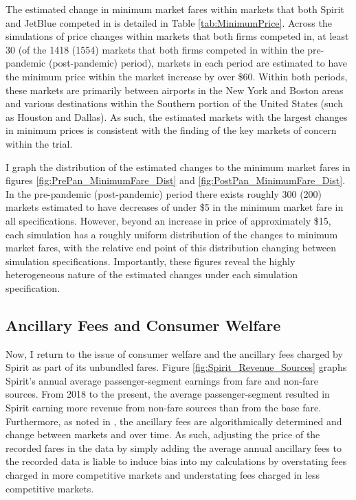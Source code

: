 \documentclass{article}
\begin{document}
     The estimated change in minimum market fares within markets that both Spirit and JetBlue competed in is detailed in Table \ref{tab:MinimumPrice}. Across the simulations of price changes within markets that both firms competed in, at least 30 (of the 1418 (1554) markets that both firms competed in within the pre-pandemic (post-pandemic) period), markets in each period are estimated to have the minimum price within the market increase by over \$60. Within both periods, these markets are primarily between airports in the New York and Boston areas and various destinations within the Southern portion of the United States (such as Houston and Dallas). As such, the estimated markets with the largest changes in minimum prices is consistent with the finding of the key markets of concern within the trial. 

    I graph the distribution of the estimated changes to the minimum market fares in figures \ref{fig:PrePan_MinimumFare_Dist} and \ref{fig:PostPan_MinimumFare_Dist}. In the pre-pandemic (post-pandemic) period there exists roughly 300 (200) markets estimated to have decreases of under \$5 in the minimum market fare in all specifications. However, beyond an increase in price of approximately \$15, each simulation has a roughly uniform distribution of the changes to minimum market fares, with the relative end point of this distribution changing between simulation specifications. Importantly, these figures reveal the highly heterogeneous nature of the estimated changes under each simulation specification.

    \subsection{Ancillary Fees and Consumer Welfare}
    \label{sec:Analysis_Welfare}
    Now, I return to the issue of consumer welfare and the ancillary fees charged by Spirit as part of its unbundled fares. Figure \ref{fig:Spirit_Revenue_Sources} graphs Spirit's annual average passenger-segment earnings from fare and non-fare sources. From 2018 to the present, the average passenger-segment resulted in Spirit earning more revenue from non-fare sources than from the base fare. Furthermore, as noted in \citep{senate_permanent_committee_on_investigations_majority_2024}, the ancillary fees are algorithmically determined and change between markets and over time. As such, adjusting the price of the recorded fares in the data by simply adding the average annual ancillary fees to the recorded data is liable to induce bias into my calculations by overstating fees charged in more competitive markets and understating fees charged in less competitive markets. 
\end{document}
